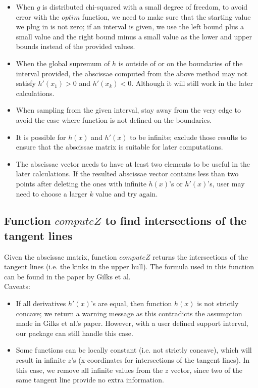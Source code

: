 \documentclass{article}\usepackage[]{graphicx}\usepackage[]{color}
\begin{document}
\begin{itemize}
\item When $g$ is distributed chi-squared with a small degree of freedom, to avoid error with the $optim$ function, we need to make sure that the starting value we plug in is not zero; if an interval is given, we use the left bound plus a small value and the right bound minus a small value as the lower and upper bounds instead of the provided values.
\item When the global supremum of $h$ is outside of or on the boundaries of the interval provided, the abscissae computed from the above method may not satisfy $h'(x_1)>0$ and $h'(x_k)<0$. Although it will still work in the later calculations.
\item When sampling from the given interval, stay away from the very edge to avoid the case where function is not defined on the boundaries.
\item It is possible for $h(x)$ and $h'(x)$ to be infinite; exclude those results to ensure that the abscissae matrix is suitable for later computations.
\item The abscissae vector needs to have at least two elements to be useful in the later calculations. If the resulted abscissae vector contains less than two points after deleting the ones with infinite $h(x)$'s or $h'(x)$'s, user may need to choose a larger $k$ value and try again.
\end{itemize}

\subsection{Function $computeZ$ to find intersections of the tangent lines}

Given the abscissae matrix, function $computeZ$ returns the intersections of the tangent lines (i.e. the kinks in the upper hull). The formula used in this function can be found in the paper by Gilks et al.
\\[12pt]
Caveats:
\begin{itemize}

\item If all derivatives $h'(x)$'s are equal, then function $h(x)$ is not strictly concave; we return a warning message as this contradicts the assumption made in Gilks et al.'s paper. However, with a user defined support interval, our package can still handle this case.

\item Some functions can be locally constant (i.e. not strictly concave), which will result in infinite $z$'s (x-coordinates for intersections of the tangent lines). In this case, we remove all infinite values from the $z$ vector, since two of the same tangent line provide no extra information.
\end{itemize}
\end{document}
